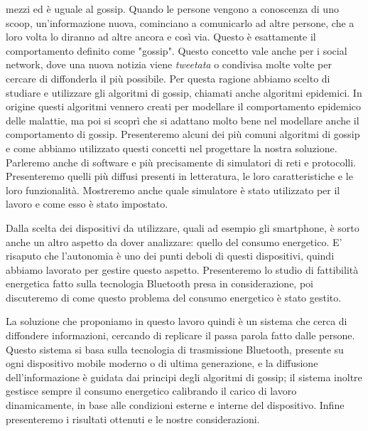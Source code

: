 mezzi ed è uguale al gossip. Quando le persone vengono a conoscenza di uno scoop, un'informazione nuova, cominciano a comunicarlo ad altre persone, che a loro volta lo diranno ad altre ancora e così via. Questo è esattamente il comportamento definito come "gossip". Questo concetto vale anche per i social network, dove una nuova notizia viene \textit{tweetata} o condivisa molte volte per cercare di diffonderla il più possibile. Per questa ragione abbiamo scelto di studiare e utilizzare gli algoritmi di gossip, chiamati anche algoritmi epidemici. In origine questi algoritmi vennero creati per modellare il comportamento epidemico delle malattie, ma poi si scoprì che si adattano molto bene nel modellare anche il comportamento di gossip. Presenteremo alcuni dei più comuni algoritmi di gossip e come abbiamo utilizzato questi concetti nel progettare la nostra soluzione. Parleremo anche di software e più precisamente di simulatori di reti e protocolli. Presenteremo quelli più diffusi presenti in letteratura, le loro caratteristiche e le loro funzionalità. Mostreremo anche quale simulatore è stato utilizzato per il lavoro e come esso è stato impostato.

Dalla scelta dei dispositivi da utilizzare, quali ad esempio gli smartphone, è sorto anche un altro aspetto da dover analizzare: quello del consumo energetico. E' risaputo che l'autonomia è uno dei punti deboli di questi dispositivi, quindi abbiamo lavorato per gestire questo aspetto. Presenteremo lo studio di fattibilità energetica fatto sulla tecnologia Bluetooth presa in considerazione, poi discuteremo di come questo problema del consumo energetico è stato gestito.

La soluzione che proponiamo in questo lavoro quindi è un sistema che cerca di diffondere informazioni, cercando di replicare il passa parola fatto dalle persone. Questo sistema si basa sulla tecnologia di trasmissione Bluetooth, presente su ogni dispositivo mobile moderno o di ultima generazione, e la diffusione dell'informazione è guidata dai principi degli algoritmi di gossip; il sistema inoltre gestisce sempre il consumo energetico calibrando il carico di lavoro dinamicamente, in base alle condizioni esterne e interne del dispositivo. Infine presenteremo i risultati ottenuti e le nostre considerazioni.

